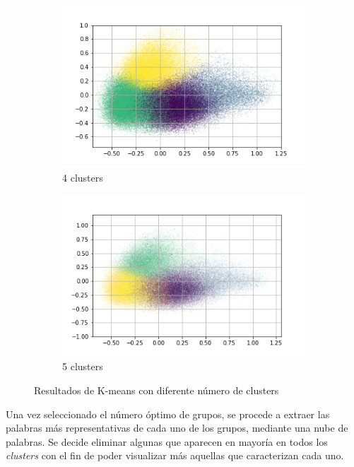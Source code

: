 \begin{figure}
\begin{subfigure}[b]{0.4\textwidth}
         \includegraphics[width=\textwidth]{results/TopicDetection/es/PCA_4.png}
         \caption{4 clusters}
         \label{fig:es_kmeans_4}
     \end{subfigure}
     \hfill
     \begin{subfigure}[b]{0.4\textwidth}
         \centering
         \includegraphics[width=\textwidth]{results/TopicDetection/es/PCA_5.png}
         \caption{5 clusters}
         \label{fig:es_kmeans_5}
     \end{subfigure}
        \caption{Resultados de K-means con diferente número de clusters}
        \label{fig:es_kmeans}
\end{figure}

Una vez seleccionado el número óptimo de grupos, se procede a extraer las palabras más representativas de cada uno de los grupos, mediante una nube de palabras. Se decide eliminar algunas que aparecen en mayoría en todos los \textit{clusters} con el fin de poder visualizar más aquellas que caracterizan cada uno.\\

